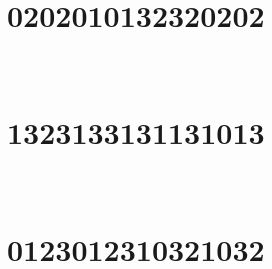 \section{0202010132320202}

\marginnote[3\baselineskip]{\centering}



\,
\newline
\vspace{1.2cm}

\section{1323133131131013}

\marginnote[3\baselineskip]{\centering}



\,
\newline
\vspace{1.2cm}

\section{0123012310321032}

\marginnote[3\baselineskip]{\centering}



\,
\newline
\vspace{1.2cm}
